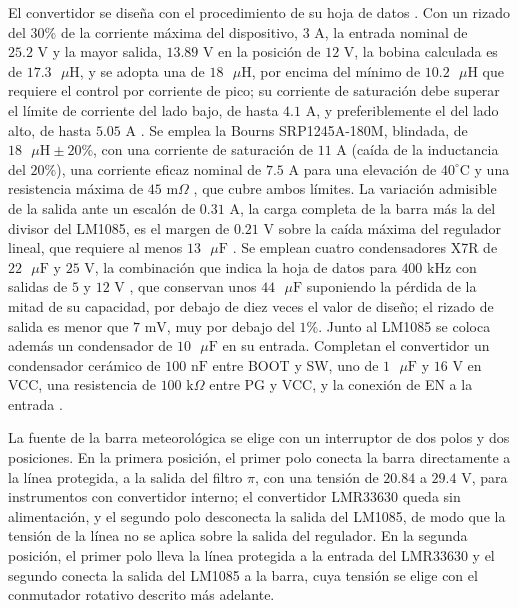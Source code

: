 \documentclass[../../General.tex]{subfiles}
\begin{document}
El convertidor se diseña con el procedimiento de su hoja de datos \citep{ti_lmr33630}. Con un rizado del $30\%$ de la corriente máxima del dispositivo, $3\text{ A}$, la entrada nominal de $25.2\text{ V}$ y la mayor salida, $13.89\text{ V}$ en la posición de $12\text{ V}$, la bobina calculada es de $17.3\text{ }\mu\text{H}$, y se adopta una de $18\text{ }\mu\text{H}$, por encima del mínimo de $10.2\text{ }\mu\text{H}$ que requiere el control por corriente de pico; su corriente de saturación debe superar el límite de corriente del lado bajo, de hasta $4.1\text{ A}$, y preferiblemente el del lado alto, de hasta $5.05\text{ A}$ \citep{ti_lmr33630}. Se emplea la Bourns SRP1245A-180M, blindada, de $18\text{ }\mu\text{H} \pm 20\%$, con una corriente de saturación de $11\text{ A}$ (caída de la inductancia del $20\%$), una corriente eficaz nominal de $7.5\text{ A}$ para una elevación de $40^\circ\text{C}$ y una resistencia máxima de $45\text{ m}\Omega$ \citep{bourns_srp1245a}, que cubre ambos límites. La variación admisible de la salida ante un escalón de $0.31\text{ A}$, la carga completa de la barra más la del divisor del LM1085, es el margen de $0.21\text{ V}$ sobre la caída máxima del regulador lineal, que requiere al menos $13\text{ }\mu\text{F}$ \citep{ti_lmr33630}. Se emplean cuatro condensadores X7R de $22\text{ }\mu\text{F}$ y $25\text{ V}$, la combinación que indica la hoja de datos para $400\text{ kHz}$ con salidas de $5$ y $12\text{ V}$ \citep{ti_lmr33630}, que conservan unos $44\text{ }\mu\text{F}$ suponiendo la pérdida de la mitad de su capacidad, por debajo de diez veces el valor de diseño; el rizado de salida es menor que $7\text{ mV}$, muy por debajo del $1\%$. Junto al LM1085 se coloca además un condensador de $10\text{ }\mu\text{F}$ en su entrada. Completan el convertidor un condensador cerámico de $100\text{ nF}$ entre BOOT y SW, uno de $1\text{ }\mu\text{F}$ y $16\text{ V}$ en VCC, una resistencia de $100\text{ k}\Omega$ entre PG y VCC, y la conexión de EN a la entrada \citep{ti_lmr33630}.

La fuente de la barra meteorológica se elige con un interruptor de dos polos y dos posiciones. En la primera posición, el primer polo conecta la barra directamente a la línea protegida, a la salida del filtro $\pi$, con una tensión de $20.84$ a $29.4\text{ V}$, para instrumentos con convertidor interno; el convertidor LMR33630 queda sin alimentación, y el segundo polo desconecta la salida del LM1085, de modo que la tensión de la línea no se aplica sobre la salida del regulador. En la segunda posición, el primer polo lleva la línea protegida a la entrada del LMR33630 y el segundo conecta la salida del LM1085 a la barra, cuya tensión se elige con el conmutador rotativo descrito más adelante.
\end{document}
